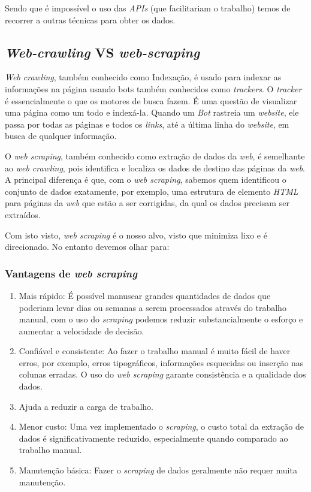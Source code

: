 Sendo que é impossível o uso das \textit{APIs} (que facilitariam o trabalho) temos de recorrer a outras técnicas para obter os dados.

\subsection{\textit{Web-crawling} VS \textit{web-scraping}}

\textit{Web crawling}, também conhecido como Indexação, é usado para indexar as informações na página usando bots também conhecidos como \textit{trackers}.
O \textit{tracker} é essencialmente o que os motores de busca fazem.
É uma questão de visualizar uma página como um todo e indexá-la.
Quando um \textit{Bot} rastreia um \textit{website}, ele passa por todas as páginas e todos os \textit{links}, até a última linha do \textit{website}, em busca de qualquer informação.

O \textit{web scraping}, também conhecido como extração de dados da \textit{web}, é semelhante ao \textit{web crawling}, pois identifica e localiza os dados de destino das páginas da \textit{web}.
A principal diferença é que, com o \textit{web scraping}, sabemos quem identificou o conjunto de dados exatamente, por exemplo, uma estrutura de elemento \textit{HTML} para páginas da \textit{web} que estão a ser corrigidas, da qual os dados precisam ser extraídos.

Com isto visto, \textit{web scraping} é o nosso alvo, visto que minimiza lixo e é direcionado.
No entanto devemos olhar para:

\subsubsection{Vantagens de \textit{web scraping}}

\begin{enumerate}
  \item Mais rápido: É possível manusear grandes quantidades de dados que poderiam levar dias ou semanas a serem processados através do trabalho manual, com o uso do \textit{scraping} podemos reduzir substancialmente o esforço e aumentar a velocidade de decisão.
  \item Confiável e consistente: Ao fazer o trabalho manual é muito fácil de haver erros, por exemplo, erros tipográficos, informações esquecidas ou inserção nas colunas erradas. O uso do \textit{web scraping} garante consistência e a qualidade dos dados.
  \item Ajuda a reduzir a carga de trabalho.
  \item Menor custo: Uma vez implementado o \textit{scraping}, o custo total da extração de dados é significativamente reduzido, especialmente quando comparado ao trabalho manual.
  \item Manutenção básica: Fazer o \textit{scraping} de dados geralmente não requer muita manutenção.
\end{enumerate}

